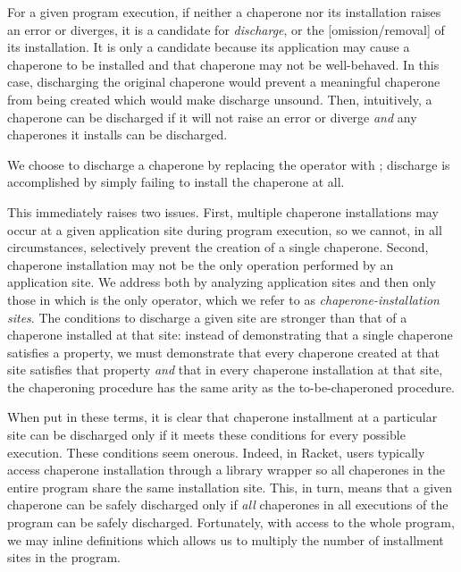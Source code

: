 \documentclass{sigplanconf}
\begin{document}
For a given program execution, if neither a chaperone nor its installation raises an error or diverges, it is a candidate for \emph{discharge}, or the [omission/removal] of its installation.
It is only a candidate because its application may cause a chaperone to be installed and that chaperone may not be well-behaved.
In this case, discharging the original chaperone would prevent a meaningful chaperone from being created which would make discharge unsound.
Then, intuitively, a chaperone can be discharged if it will not raise an error or diverge  \emph{and} any chaperones it installs can be discharged.

We choose to discharge a chaperone by replacing the  operator with ; discharge is accomplished by simply failing to install the chaperone at all.

This immediately raises two issues.
First, multiple chaperone installations may occur at a given application site during program execution, so we cannot, in all circumstances, selectively prevent the creation of a single chaperone.
Second, chaperone installation may not be the only operation performed by an application site.
We address both by analyzing application sites and then only those in which  is the only operator, which we refer to as \emph{chaperone-installation sites}.
The conditions to discharge a given site are stronger than that of a chaperone installed at that site: instead of demonstrating that a single chaperone satisfies a property, we must demonstrate that every chaperone created at that site satisfies that property \emph{and} that in every chaperone installation at that site, the chaperoning procedure has the same arity as the to-be-chaperoned procedure.

When put in these terms, it is clear that chaperone installment at a particular site can be discharged only if it meets these conditions for every possible execution.
These conditions seem onerous.
Indeed, in Racket, users typically access chaperone installation through a library wrapper so all chaperones in the entire program share the same installation site.
This, in turn, means that a given chaperone can be safely discharged only if \emph{all} chaperones in all executions of the program can be safely discharged.
Fortunately, with access to the whole program, we may inline definitions which allows us to multiply the number of installment sites in the program.
\end{document}
